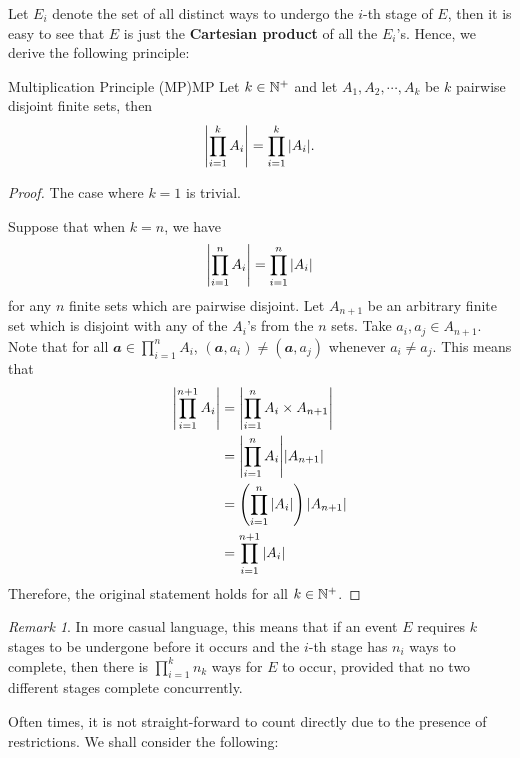 \documentclass[math]{amznotes}
\theoremstyle{remark}
\newtheorem*{remark}{Remark}
\begin{document}
Let $E_i$ denote the set of all distinct ways to undergo the $i$-th stage of $E$, then it is easy to see that $E$ is just the \textbf{Cartesian product} of all the $E_i$'s. Hence, we derive the following principle:
\begin{thmbox}{Multiplication Principle (MP)}{MP}
    Let $k \in \mathbb{N}^+$ and let $A_1, A_2, \cdots, A_k$ be $k$ pairwise disjoint finite sets, then
    \begin{equation*}
        {\left\lvert {\prod_{i = 1}^{k}A_i} \right\rvert} = \prod_{i = 1}^{k}{\left\lvert {A_i} \right\rvert}.
    \end{equation*}
    \tcblower
    \begin{proof}
        The case where $k = 1$ is trivial.

        Suppose that when $k = n$, we have
        \begin{equation*}
            {\left\lvert {\prod_{i = 1}^{n}A_i} \right\rvert} = \prod_{i = 1}^{n}{\left\lvert {A_i} \right\rvert}
        \end{equation*} 
        for any $n$ finite sets which are pairwise disjoint. Let $A_{n + 1}$ be an arbitrary finite set which is disjoint with any of the $A_i$'s from the $n$ sets. Take $a_i, a_j \in A_{n + 1}$. Note that for all $\mathbfit{a} \in \prod_{i = 1}^{n}A_i$, $(\mathbfit{a}, a_i) \neq (\mathbfit{a}, a_j)$ whenever $a_i \neq a_j$. This means that
        \begin{align*}
            {\left\lvert {\prod_{i = 1}^{n + 1}A_i} \right\rvert} & = {\left\lvert {\prod_{i = 1}^{n}A_i \times A_{n + 1}} \right\rvert} \\
            & = {\left\lvert {\prod_{i = 1}^{n}A_i} \right\rvert}{\left\lvert {A_{n + 1}} \right\rvert} \\
            & = \left(\prod_{i = 1}^{n}{\left\lvert {A_i} \right\rvert}\right){\left\lvert {A_{n + 1}} \right\rvert} \\
            & = \prod_{i = 1}^{n + 1}{\left\lvert {A_i} \right\rvert}
        \end{align*}
        Therefore, the original statement holds for all $k \in \mathbb{N}^+$.
    \end{proof}
\end{thmbox}
\begin{notebox}
    \begin{remark}
        In more casual language, this means that if an event $E$ requires $k$ stages to be undergone before it occurs and the $i$-th stage has $n_i$ ways to complete, then there is $\prod_{i = 1}^{k}n_k$ ways for $E$ to occur, provided that no two different stages complete concurrently.
    \end{remark}
\end{notebox}
Often times, it is not straight-forward to count directly due to the presence of restrictions. We shall consider the following:
\end{document}
